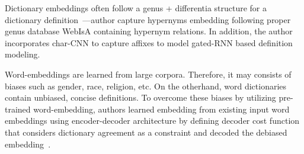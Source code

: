 Dictionary embeddings often follow a genus + differentia structure for a dictionary definition~\cite{noraset_definition_2016}—author capture hypernyms embedding following proper genus database WebIsA containing hypernym relations. In addition, the author incorporates char-CNN to capture affixes to model gated-RNN based definition modeling.


Word-embeddings are learned from large corpora. Therefore, it may consists of biases such as gender, race, religion, etc. On the otherhand, word dictionaries contain unbiased, concise definitions. To overcome these biases by utilizing pre-trained word-embedding, authors learned embedding from existing input word embeddings using encoder-decoder architecture by defining decoder cost function that considers dictionary agreement as a constraint and decoded the debiased embedding~\cite{kaneko_dictionary_2021}. 









